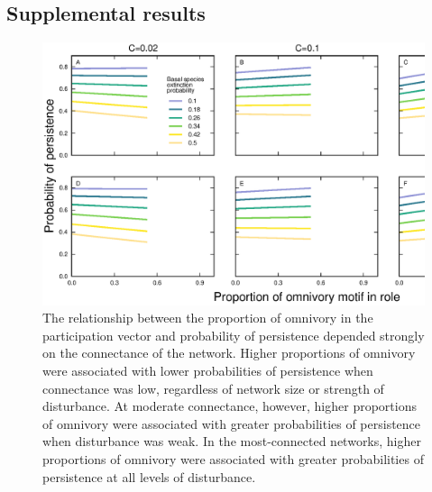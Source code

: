 \documentclass[12pt]{article}
\begin{document}
\begin{spacing}{2.0}
    \subsection{Supplemental results}
    
    \begin{figure}[ht!]
        \centering
        \includegraphics[width=\textwidth]{figures/persistence_omnivory_detailpers.eps}
        \caption{The relationship between the proportion of omnivory in the participation vector and probability of persistence depended strongly on the connectance of the network.
        Higher proportions of omnivory were associated with lower probabilities of persistence when connectance was low, regardless of network size or strength of disturbance.
        At moderate connectance, however, higher proportions of omnivory were associated with greater probabilities of persistence when disturbance was weak.
        In the most-connected networks, higher proportions of omnivory were associated with greater probabilities of persistence at all levels of disturbance.}
        \label{omnivory_plus_SC}
        \end{figure}


\end{spacing}
\end{document}
